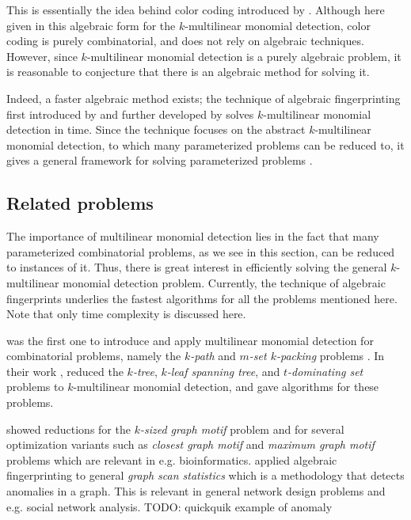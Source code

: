 This is essentially the idea behind color coding 
introduced by \textcite{Alon95}. 
Although here given in this algebraic form for 
the $k$-multilinear monomial detection, 
color coding is purely combinatorial, 
and does not rely on algebraic techniques. 
However, since $k$-multilinear monomial detection is a 
purely algebraic problem, it is reasonable to 
conjecture that there is an algebraic method for solving it.

Indeed, a faster algebraic method exists; the technique of algebraic fingerprinting 
first introduced by \textcite{Koutis08} and 
further developed by \textcite{Williams09} 
solves $k$-multilinear monomial detection in  time. 
Since the technique focuses on the abstract $k$-multilinear monomial detection, 
to which many parameterized problems can be reduced to, 
it gives a general framework for 
solving parameterized problems \cite{KouWil15}.

\subsection{Related problems}
\label{sect:related_problems}

The importance of multilinear monomial detection lies in the fact 
that many parameterized combinatorial problems, as we see in this section, 
can be reduced to instances of it. 
Thus, there is great interest in efficiently solving the 
general $k$-multilinear monomial detection problem. 
Currently, the technique of algebraic fingerprints underlies the fastest algorithms 
for all the problems mentioned here. 
Note that only time complexity is discussed here. 

\citeauthor{Koutis08} was the first one to introduce and apply multilinear monomial 
detection for combinatorial problems, namely the \emph{$k$-path} and \emph{$m$-set $k$-packing} problems 
\cite{Koutis08}. 
In their work \cite{KouWil09}, \citeauthor{KouWil09} reduced 
the \emph{$k$-tree}, \emph{$k$-leaf spanning tree}, and \emph{$t$-dominating set} problems 
to $k$-multilinear monomial detection, and 
gave  algorithms for these problems.  

\textcite{Björklund16} showed reductions for the 
\emph{$k$-sized graph motif} problem and for
several optimization variants such as \emph{closest graph motif} 
and \emph{maximum graph motif} problems which are relevant in e.g. bioinformatics. 
\textcite{Cadena17} 
applied algebraic fingerprinting to general \emph{graph scan statistics} 
which is a methodology that detects anomalies in a graph. This is relevant in 
general network design problems and e.g. social network analysis. TODO: quickquik example of anomaly

